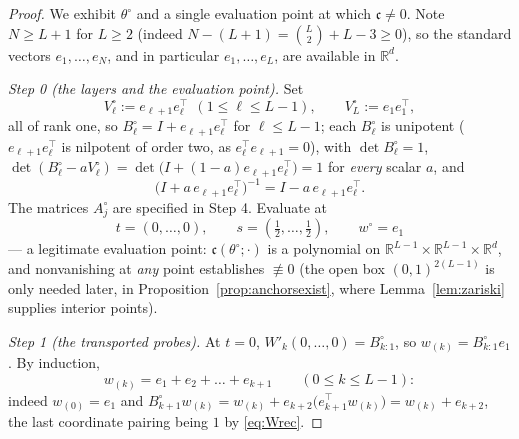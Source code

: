 \documentclass[11pt]{article}
\theoremstyle{definition}
\theoremstyle{remark}
\theoremstyle{plain}
\newcommand{\R}{\mathbb{R}}
\begin{document}
\begin{proof}
We exhibit $\theta^\circ$ and a single evaluation point at which
$\mathfrak c\neq0$.  Note $N\ge L+1$ for $L\ge2$ (indeed
$N-(L+1)=\binom L2+L-3\ge0$), so the standard vectors $e_1,\dots,e_N$, and in
particular $e_1,\dots,e_{L}$, are available in $\R^d$.

\emph{Step 0 (the layers and the evaluation point).}  Set
\[
V^\circ_\ell:=e_{\ell+1}e_\ell^\top\ \ (1\le\ell\le L-1),\qquad
V^\circ_L:=e_1e_1^\top,
\]
all of rank one, so $B^\circ_\ell=I+e_{\ell+1}e_\ell^\top$ for $\ell\le L-1$; each
$B^\circ_\ell$ is unipotent ($e_{\ell+1}e_\ell^\top$ is nilpotent of order two, as
$e_\ell^\top e_{\ell+1}=0$), with
$\det B^\circ_\ell=1$, $\det(B^\circ_\ell-aV^\circ_\ell)
=\det\big(I+(1-a)e_{\ell+1}e_\ell^\top\big)=1$ for \emph{every} scalar $a$, and
\[
\big(I+a\,e_{\ell+1}e_\ell^\top\big)^{-1}=I-a\,e_{\ell+1}e_\ell^\top .
\]
The matrices $A^\circ_j$ are specified in Step 4.  Evaluate at
\[
t=(0,\dots,0),\qquad s=(\tfrac12,\dots,\tfrac12),\qquad w^\circ=e_1
\]
--- a legitimate evaluation point: $\mathfrak c(\theta^\circ;\cdot)$ is a polynomial
on $\R^{L-1}\times\R^{L-1}\times\R^d$, and nonvanishing at \emph{any} point
establishes $\not\equiv0$ (the open box $(0,1)^{2(L-1)}$ is only needed later, in
Proposition~\ref{prop:anchorsexist}, where Lemma~\ref{lem:zariski} supplies interior
points).

\emph{Step 1 (the transported probes).}  At $t=0$, $W'_k(0,\dots,0)=B^\circ_{k:1}$,
so $w_{(k)}=B^\circ_{k:1}e_1$.  By induction,
\begin{equation}\label{eq:Wrec}
w_{(k)}=e_1+e_2+\dots+e_{k+1}\qquad(0\le k\le L-1):
\end{equation}
indeed $w_{(0)}=e_1$ and
$B^\circ_{k+1}w_{(k)}=w_{(k)}+e_{k+2}\big(e_{k+1}^\top w_{(k)}\big)
=w_{(k)}+e_{k+2}$, the last coordinate pairing being $1$ by \eqref{eq:Wrec}.


\end{proof}
\end{document}
